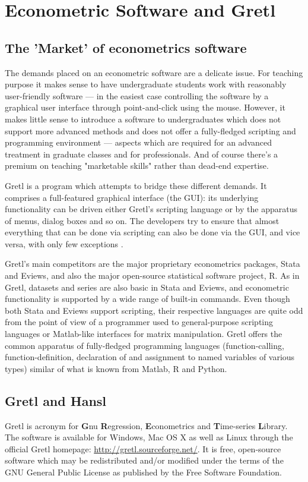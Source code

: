 \documentclass[11pt]{article}
\newcommand{\remph}[1]{{\color{myred}#1}}
\begin{document}
\section{Econometric Software and Gretl}

\subsection{The 'Market' of econometrics software}
The demands placed on an econometric software are a delicate issue. For teaching purpose it makes sense to have undergraduate students work with reasonably user-friendly software --- in the easiest case controlling the software by a graphical user interface through point-and-click using the mouse. However, it makes little sense to introduce a software to undergraduates which does not support more advanced methods and does not offer a fully-fledged scripting and programming environment --- aspects which are required for an advanced treatment in graduate classes and for professionals. And of course there's a premium on teaching "marketable skills" rather than dead-end expertise.

Gretl is a program which attempts to bridge these different demands. It comprises a full-featured graphical interface (the GUI): its underlying
functionality can be driven either Gretl's scripting language or by the apparatus of menus, dialog boxes and so on. The developers try to ensure that almost everything that can be done via scripting can also be done via the GUI, and vice versa, with only few exceptions \citep{Cottrell2017}.

Gretl's main competitors are the major proprietary econometrics packages, Stata and Eviews, and also the major open-source statistical software project, R. As in Gretl, datasets and series are also basic in Stata and Eviews, and econometric functionality is supported by a wide range of built-in commands. Even though both Stata and Eviews support scripting, their respective languages are quite odd from the point of view of a programmer used to general-purpose scripting languages or Matlab-like interfaces for matrix manipulation. %
Gretl offers the common apparatus of fully-fledged programming languages (function-calling, function-definition, declaration of and assignment to named variables of various types) similar of what is known from Matlab, R and Python.

\subsection{Gretl and Hansl}
Gretl is acronym for \textbf{G}nu \textbf{R}egression, \textbf{E}conometrics and \textbf{T}ime-series \textbf{L}ibrary. The software is available for Windows, Mac OS X as well as Linux through the official Gretl homepage: \url{http://gretl.sourceforge.net/}. It is free, open-source software which may be redistributed and/or modified under the terms of the GNU General Public License as published by the Free Software Foundation.
\end{document}
